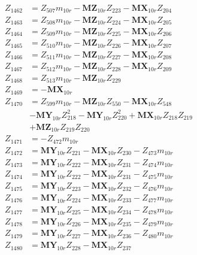 \begin{multicols}{2}
\begin{align}
Z_{1462} &= Z_{507}m_{10r} - \mathbf{MZ}_{10r}Z_{223} - \mathbf{MX}_{10r}Z_{204} \nonumber \\
Z_{1463} &= Z_{508}m_{10r} - \mathbf{MZ}_{10r}Z_{224} - \mathbf{MX}_{10r}Z_{205} \nonumber \\
Z_{1464} &= Z_{509}m_{10r} - \mathbf{MZ}_{10r}Z_{225} - \mathbf{MX}_{10r}Z_{206} \nonumber \\
Z_{1465} &= Z_{510}m_{10r} - \mathbf{MZ}_{10r}Z_{226} - \mathbf{MX}_{10r}Z_{207} \nonumber \\
Z_{1466} &= Z_{511}m_{10r} - \mathbf{MZ}_{10r}Z_{227} - \mathbf{MX}_{10r}Z_{208} \nonumber \\
Z_{1467} &= Z_{512}m_{10r} - \mathbf{MZ}_{10r}Z_{228} - \mathbf{MX}_{10r}Z_{209} \nonumber \\
Z_{1468} &= Z_{513}m_{10r} - \mathbf{MZ}_{10r}Z_{229} \nonumber \\
Z_{1469} &= -\mathbf{MX}_{10r} \nonumber \\
Z_{1470} &= Z_{599}m_{10r} - \mathbf{MZ}_{10r}Z_{550} - \mathbf{MX}_{10r}Z_{548}  \nonumber \\
&- \mathbf{MY}_{10r}Z_{218}^2 - \mathbf{MY}_{10r}Z_{220}^2 + \mathbf{MX}_{10r}Z_{218}Z_{219}  \nonumber \\
&+ \mathbf{MZ}_{10r}Z_{219}Z_{220} \nonumber \\
Z_{1471} &= -Z_{472}m_{10r} \nonumber \\
Z_{1472} &= \mathbf{MY}_{10r}Z_{221} - \mathbf{MX}_{10r}Z_{230} - Z_{473}m_{10r} \nonumber \\
Z_{1473} &= \mathbf{MY}_{10r}Z_{222} - \mathbf{MX}_{10r}Z_{231} - Z_{474}m_{10r} \nonumber \\
Z_{1474} &= \mathbf{MY}_{10r}Z_{222} - \mathbf{MX}_{10r}Z_{231} - Z_{475}m_{10r} \nonumber \\
Z_{1475} &= \mathbf{MY}_{10r}Z_{223} - \mathbf{MX}_{10r}Z_{232} - Z_{476}m_{10r} \nonumber \\
Z_{1476} &= \mathbf{MY}_{10r}Z_{224} - \mathbf{MX}_{10r}Z_{233} - Z_{477}m_{10r} \nonumber \\
Z_{1477} &= \mathbf{MY}_{10r}Z_{225} - \mathbf{MX}_{10r}Z_{234} - Z_{478}m_{10r} \nonumber \\
Z_{1478} &= \mathbf{MY}_{10r}Z_{226} - \mathbf{MX}_{10r}Z_{235} - Z_{479}m_{10r} \nonumber \\
Z_{1479} &= \mathbf{MY}_{10r}Z_{227} - \mathbf{MX}_{10r}Z_{236} - Z_{480}m_{10r} \nonumber \\
Z_{1480} &= \mathbf{MY}_{10r}Z_{228} - \mathbf{MX}_{10r}Z_{237} \nonumber \\

\end{align}
\end{multicols}
